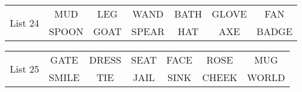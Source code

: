 \documentclass{article}
\begin{document}
\vspace{.1in}
\hspace{.5in}\begin{tabular}{r||c c c c c c }
\multirow{2}{*}{List 24} & MUD & LEG & WAND & BATH & GLOVE & FAN\\
\cline{2-7}			& SPOON & GOAT & SPEAR & HAT & AXE & BADGE\\
\end{tabular}

\vspace{.1in}
\hspace{.5in}\begin{tabular}{r||c c c c c c }
\multirow{2}{*}{List 25} & GATE & DRESS & SEAT & FACE & ROSE & MUG\\
\cline{2-7}			& SMILE & TIE & JAIL & SINK & CHEEK & WORLD\\
\end{tabular}
\end{document}

